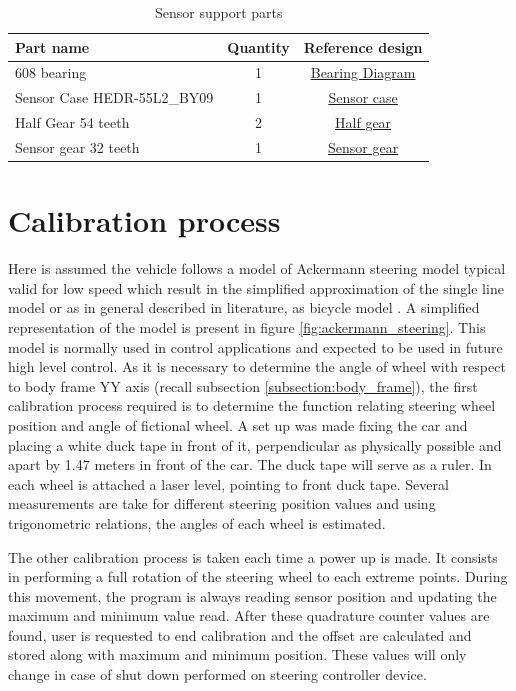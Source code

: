 \begin{table}[!hb]
    \centering
	\begin{tabular}{lcc}
		\toprule
		\textbf{Part name} & \textbf{Quantity} & \textbf{Reference design}\\
		\midrule
		608 bearing & 1 & \hyperref[draw:bearing]{Bearing Diagram}\\
		Sensor Case HEDR-55L2\_BY09 & 1 & \hyperref[draw:sensor-case]{Sensor case}\\
        Half Gear 54 teeth & 2 & \hyperref[draw:half-gear]{Half gear}\\
        Sensor gear 32 teeth & 1 & \hyperref[draw:sensor-gear]{Sensor gear}\\
		\bottomrule
	\end{tabular}
\caption{Sensor support parts}
\label{tab:sensor_support_parts}
\end{table}



\section{Calibration process}
Here is assumed the vehicle follows a model of Ackermann steering model typical valid for low speed which result in the simplified approximation of the single line model or as in general described in literature, as bicycle model\cite{Snider2009} \cite{Navigation_System_Design}. A simplified representation of the model is present in figure \ref{fig:ackermann_steering}. This model is normally used in control applications and expected to be used in future high level control. As it is necessary to determine the angle of wheel with respect to body frame YY axis (recall subsection \ref{subsection:body_frame}), the first calibration process required is to determine the function relating steering wheel position and angle of fictional wheel. A set up was made fixing the car and placing a white duck tape in front of it, perpendicular as physically possible and apart by 1.47 meters in front of the car. The duck tape will serve as a ruler. In each wheel is attached a laser level, pointing to front duck tape. Several measurements are take for different steering position values and using trigonometric relations, the angles of each wheel is estimated. 

The other calibration process is taken each time a power up is made. It consists in performing a full rotation of the steering wheel to each extreme points. During this movement, the program is always reading sensor position and updating the maximum and minimum value read. After these quadrature counter values are found, user is requested to end calibration and the offset are calculated and stored along with maximum and minimum position. These values will only change in case of shut down performed on steering controller device.

